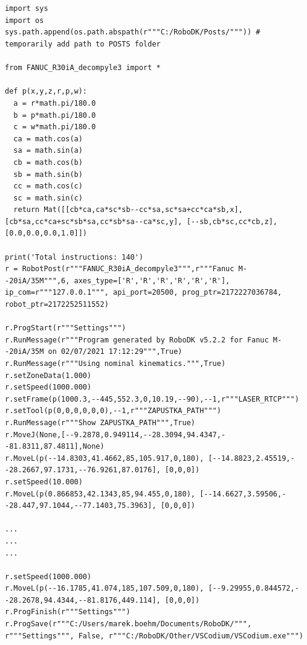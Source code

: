 

\begin{lstlisting}[numbers=none,caption={Code snippet of preprocessed program to be executed by post processor},captionpos=b,label={code:preprocessed_python}, language={}]


import sys
import os
sys.path.append(os.path.abspath(r"""C:/RoboDK/Posts/""")) # temporarily add path to POSTS folder

from FANUC_R30iA_decompyle3 import *

def p(x,y,z,r,p,w):
  a = r*math.pi/180.0
  b = p*math.pi/180.0
  c = w*math.pi/180.0
  ca = math.cos(a)
  sa = math.sin(a)
  cb = math.cos(b)
  sb = math.sin(b)
  cc = math.cos(c)
  sc = math.sin(c)
  return Mat([[cb*ca,ca*sc*sb--cc*sa,sc*sa+cc*ca*sb,x], [cb*sa,cc*ca+sc*sb*sa,cc*sb*sa--ca*sc,y], [--sb,cb*sc,cc*cb,z], [0.0,0.0,0.0,1.0]])

print('Total instructions: 140')
r = RobotPost(r"""FANUC_R30iA_decompyle3""",r"""Fanuc M--20iA/35M""",6, axes_type=['R','R','R','R','R','R'], ip_com=r"""127.0.0.1""", api_port=20500, prog_ptr=2172227036784, robot_ptr=2172252511552)

r.ProgStart(r"""Settings""")
r.RunMessage(r"""Program generated by RoboDK v5.2.2 for Fanuc M--20iA/35M on 02/07/2021 17:12:29""",True)
r.RunMessage(r"""Using nominal kinematics.""",True)
r.setZoneData(1.000)
r.setSpeed(1000.000)
r.setFrame(p(1000.3,--445,552.3,0,10.19,--90),--1,r"""LASER_RTCP""")
r.setTool(p(0,0,0,0,0,0),--1,r"""ZAPUSTKA_PATH""")
r.RunMessage(r"""Show ZAPUSTKA_PATH""",True)
r.MoveJ(None,[--9.2878,0.949114,--28.3094,94.4347,--81.8311,87.4811],None)
r.MoveL(p(--14.8303,41.4662,85,105.917,0,180), [--14.8823,2.45519,--28.2667,97.1731,--76.9261,87.0176], [0,0,0])
r.setSpeed(10.000)
r.MoveL(p(0.866853,42.1343,85,94.455,0,180), [--14.6627,3.59506,--28.447,97.1044,--77.1403,75.3963], [0,0,0])

...
...
...

r.setSpeed(1000.000)
r.MoveL(p(--16.1785,41.074,185,107.509,0,180), [--9.29955,0.844572,--28.2678,94.4344,--81.8176,449.114], [0,0,0])
r.ProgFinish(r"""Settings""")
r.ProgSave(r"""C:/Users/marek.boehm/Documents/RoboDK/""", r"""Settings""", False, r"""C:/RoboDK/Other/VSCodium/VSCodium.exe""")


\end{lstlisting}



